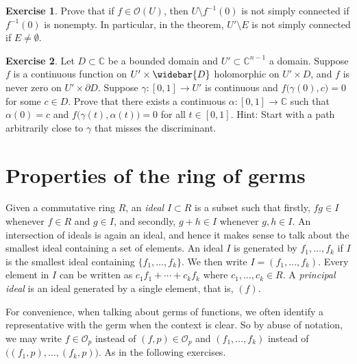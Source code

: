 \documentclass[12pt,openany]{book}
\newcommand{\C}{{\mathbb{C}}}
\newcommand{\sO}{{\mathscr{O}}}
\newcommand{\myindex}[1]{#1\index{#1}}
\theoremstyle{plain}
\theoremstyle{remark}
\theoremstyle{definition}
\newenvironment{exbox}{%
    \def\FrameCommand{\vrule width 1pt \relax\hspace{10pt}}%
    \MakeFramed{\advance\hsize-\width\FrameRestore}%
}{%
    \endMakeFramed
}
\theoremstyle{exercise}
\newtheorem{exercise}{Exercise}[section]
\theoremstyle{example}
\begin{document}
\begin{exbox}
\begin{exercise}
Prove that if $f \in \sO(U)$, then $U \setminus f^{-1}(0)$ is not simply
connected if $f^{-1}(0)$ is nonempty.  In particular, in the theorem, $U' \setminus E$ is not
simply connected if $E \not= \emptyset$.
\end{exercise}

\begin{exercise}
\pagebreak[2]
Let $D \subset \C$ be a bounded domain
and
$U' \subset \C^{n-1}$ a domain.
Suppose
$f$ is a continuous function on
$U' \times \widebar{D}$ holomorphic on $U' \times D$,
and $f$ is never zero on
$U' \times \partial D$.
Suppose $\gamma \colon [0,1] \to U'$ is continuous and
$f\bigl(\gamma(0),c\bigr) = 0$ for some $c \in D$.
Prove that there exists a continuous $\alpha \colon [0,1] \to \C$
such that $\alpha(0) = c$ and
$f\bigl(\gamma(t),\alpha(t)\bigr) = 0$ for all $t \in [0,1]$.
Hint: Start with a path arbitrarily close to $\gamma$
that misses the discriminant.
\end{exercise}
\end{exbox}


\section{Properties of the ring of germs} \label{sec:propertiesofringofgerms}

Given a commutative ring $R$,
an \emph{\myindex{ideal}} $I \subset R$ is
a subset such that firstly, $f g \in I$ whenever $f \in R$ and $g \in I$,
and secondly, $g+h \in I$ whenever $g,h \in I$.
An intersection of ideals is again an ideal, and hence it makes sense to
talk about the smallest ideal containing a set of elements.
An ideal $I$ is generated by $f_1,\ldots,f_k$
if $I$ is the smallest ideal containing $\{ f_1,\ldots,f_k \}$.  We then
%
write $I = (f_1,\ldots,f_k)$.
Every element in $I$ can be written as $c_1 f_1 + \cdots + c_k f_k$
where $c_1,\ldots,c_k \in R$.
A \emph{\myindex{principal ideal}}
is an ideal generated by a single element, that is, $(f)$.

For convenience, when talking about germs of functions,
we often identify a representative
with the germ when the context is clear.
So by abuse of notation, we may write
$f \in \sO_p$ instead of $(f,p) \in \sO_p$ and
$(f_1,\ldots,f_k)$ instead of $\bigl((f_1,p),\ldots,(f_k,p)\bigr)$.
As in the following exercises.
\end{document}
